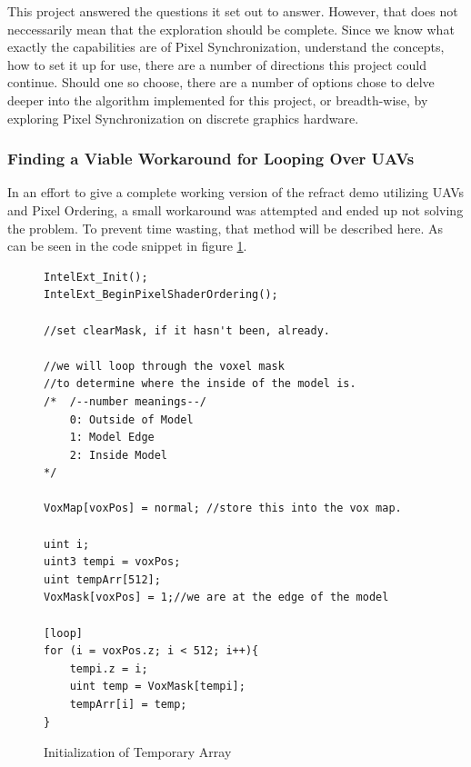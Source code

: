\documentclass[a4paper, 12pt]{article}
\begin{document}
This project answered the questions it set out to answer. However, that does
not neccessarily mean that the exploration should be complete. Since we know
what exactly the capabilities are of Pixel Synchronization, understand the
concepts, how to set it up for use, there are a number of directions this
project could continue. Should one so choose, there are a number of options
chose to delve deeper into the algorithm implemented for this project, or
breadth-wise, by exploring Pixel Synchronization on discrete graphics
hardware.

\subsubsection{Finding a Viable Workaround for Looping Over UAVs}

In an effort to give a complete working version of the refract demo utilizing
UAVs and Pixel Ordering, a small workaround was attempted and ended up not
solving the problem. To prevent time wasting, that method will be described
here. As can be seen in the code snippet in figure \ref{code:TempArrInit}.

\begin{figure}[h!]
\begin{lstlisting}[language=HLSL]
IntelExt_Init();
IntelExt_BeginPixelShaderOrdering();

//set clearMask, if it hasn't been, already.

//we will loop through the voxel mask 
//to determine where the inside of the model is.
/*	/--number meanings--/
	0: Outside of Model
	1: Model Edge
	2: Inside Model
*/

VoxMap[voxPos] = normal; //store this into the vox map.

uint i;
uint3 tempi = voxPos;
uint tempArr[512];
VoxMask[voxPos] = 1;//we are at the edge of the model

[loop]
for (i = voxPos.z; i < 512; i++){
	tempi.z = i;
	uint temp = VoxMask[tempi];
	tempArr[i] = temp;
}

\end{lstlisting}
\caption{Initialization of Temporary Array}
\label{code:TempArrInit}
\end{figure}
\end{document}
